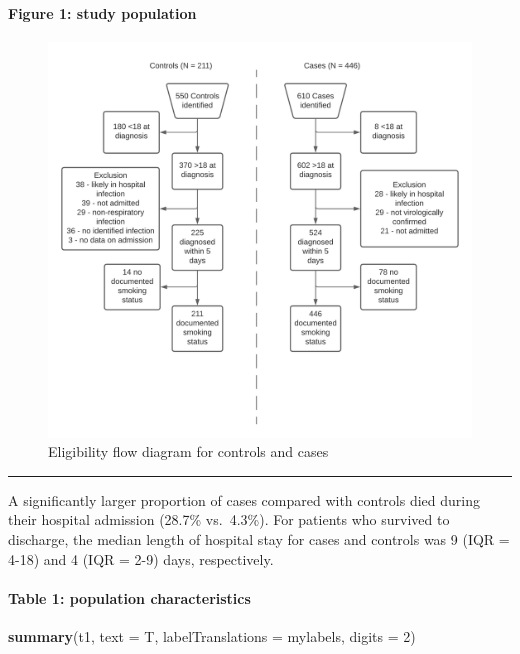 \documentclass[
]{article}
\newenvironment{Shaded}{\begin{snugshade}}{\end{snugshade}}
\newcommand{\DataTypeTok}[1]{\textcolor[rgb]{0.13,0.29,0.53}{#1}}
\newcommand{\DecValTok}[1]{\textcolor[rgb]{0.00,0.00,0.81}{#1}}
\newcommand{\KeywordTok}[1]{\textcolor[rgb]{0.13,0.29,0.53}{\textbf{#1}}}
\newcommand{\NormalTok}[1]{#1}
\begin{document}
\hypertarget{figure-1-study-population}{%
\paragraph{Figure 1: study population}\label{figure-1-study-population}}

\begin{figure}
\centering
\includegraphics{figures/flow_diagram.png}
\caption{Eligibility flow diagram for controls and cases}
\end{figure}

\begin{center}\rule{0.5\linewidth}{0.5pt}\end{center}

A significantly larger proportion of cases compared with controls died
during their hospital admission (28.7\% vs.~4.3\%). For patients who
survived to discharge, the median length of hospital stay for cases and
controls was 9 (IQR = 4-18) and 4 (IQR = 2-9) days, respectively.

\hypertarget{table-1-population-characteristics}{%
\paragraph{Table 1: population
characteristics}\label{table-1-population-characteristics}}

\begin{Shaded}
\begin{Highlighting}[]
\KeywordTok{summary}\NormalTok{(t1, }\DataTypeTok{text =}\NormalTok{ T, }\DataTypeTok{labelTranslations =}\NormalTok{ mylabels, }\DataTypeTok{digits =} \DecValTok{2}\NormalTok{)}
\end{Highlighting}
\end{Shaded}
\end{document}
